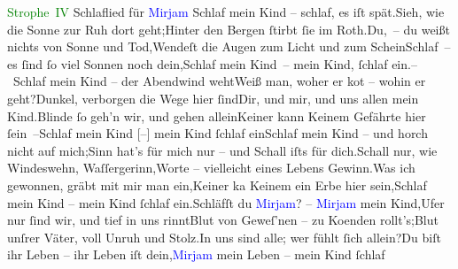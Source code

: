        \addtolength\longestz{1em}
        \addtolength\longestd{1em}
      \pstart\noindent{}
                  \pend\pstart\noindent{}
                  \pend\pstart\noindent{}
                  \pend\pstart\noindent\makebox[\the\longeste][l]{}\makebox[\the\longestz][l]{}
                  \pend\pstart
           \textcolor{green}{Strophe IV}{}\pend
           \settowidth{\longeste}{Zeile}\settowidth{\longestz}{6,}\settowidth{\longestd}{der erſte – fort}\settowidth{\longestv}{}\settowidth{\longestf}{}\addtolength\longeste{1em}
        \addtolength\longestz{1em}
        \addtolength\longestd{1em}
      \pstart\noindent{}
                  \pend\pstart\noindent{}
                  \pend\pstart\noindent{}
                  \pend{\bigskip}\pstart
           \noindent{}{\pb}Schlaflied für \textcolor{blue}{Mirjam}{}\ledrightnote{\textcolor{blue}{Mirjam Beer-Hofmann}}\pend
           {\bigskip}\stanza{}Schlaf mein Kind – schlaf, es iſt spät.\newverse{}Sieh, wie die Sonne zur Ruh dort geht;\newverse{}Hinter den Bergen ſtirbt ſie im Roth.\newverse{}Du, – du weißt nichts von Sonne und Tod,\newverse{}Wendeſt die Augen zum Licht und zum Schein\newverse{}Schlaf – es ſind ſo viel Sonnen noch dein,\newverse{}Schlaf mein Kind – mein Kind, ſchlaf ein.\stanzaend{}\stanza{}– Schlaf mein Kind – der Abendwind weht\newverse{}Weiß man, woher er ko{\geminationm}t – wohin er geht?\newverse{}Dunkel, verborgen die Wege hier ſind\newverse{}Dir, und mir, und uns allen mein Kind.\newverse{}Blinde ſo geh’n wir, und gehen allein\newverse{}Keiner kann Keinem Gefährte hier ſein –\newverse{}Schlaf mein Kind {[}–{]} mein Kind ſchlaf ein\stanzaend{}\stanza{}{\pb}Schlaf mein Kind – und horch
                     nicht auf mich;\newverse{}Sinn hat’s für mich nur – und Schall iſts für dich.\newverse{}Schall nur, wie Windeswehn, Waſſergerinn,\newverse{}Worte – vielleicht eines Lebens Gewinn.\newverse{}Was ich gewonnen, gräbt mit mir man ein,\newverse{}Keiner ka{\geminationn} Keinem ein Erbe hier sein,\newverse{}Schlaf mein Kind – mein Kind ſchlaf ein.\stanzaend{}\stanza{}Schläfſt du \textcolor{blue}{Mirjam}{}\ledrightnote{\textcolor{blue}{Mirjam Beer-Hofmann}}? – \textcolor{blue}{Mirjam}{}\ledrightnote{\textcolor{blue}{Mirjam Beer-Hofmann}} mein Kind,\newverse{}Ufer nur ſind wir, und tief in uns rinnt\newverse{}Blut von Geweſ’nen – zu Ko{\geminationm}enden rollt’s;\newverse{}Blut unſrer Väter, voll Unruh und Stolz.\newverse{}In uns sind alle; wer fühlt ſich allein?\newverse{}Du biſt ihr Leben – ihr Leben iſt dein,\newverse{}\textcolor{blue}{Mirjam}{}\ledrightnote{\textcolor{blue}{Mirjam Beer-Hofmann}} mein Leben – mein Kind ſchlaf
